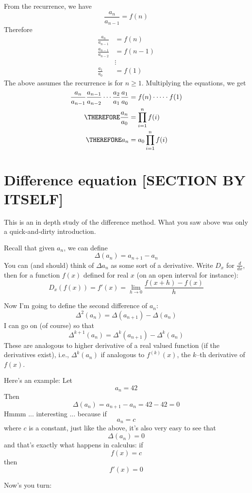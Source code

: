 From the recurrence, we have
\[
\frac{a_n}{a_{n-1}} = f(n) 
\]
Therefore
\begin{align*}
\frac{a_n}{a_{n-1}} &= f(n) \\ 
\frac{a_{n-1}}{a_{n-2}} &= f(n-1) \\
 &\vdots \\
\frac{a_1}{a_{0}} &= f(1) 
\end{align*}
The above assumes the recurrence is for $n \geq 1$.
Multiplying the equations, we get
\begin{align*}
  \frac{a_n}{a_{n-1}}
  \frac{a_{n-1}}{a_{n-2}}
  \cdots 
  \frac{a_{2}}{a_{1}}
  \frac{a_1}{a_0} &= f(n) \cdot \cdots \cdot f(1) \\
  \THEREFORE
  \frac{a_n}{a_0}
  &=  \prod_{i=1}^n f(i) \\
  \THEREFORE
  a_n &= a_0 \prod_{i=1}^n f(i)
\end{align*}




\newpage
\section{Difference equation [SECTION BY ITSELF]}

This is an in depth study of the difference method.
What you saw above was only a quick-and-dirty introduction.

Recall that given $a_n$, we can define
\[
\Delta (a_n) = a_{n+1} - a_n
\]
You can (and should) think of $\Delta a_n$ as some sort of a
derivative.
Write $D_x$ for $\frac{d}{dx}$, then for a function $f(x)$
defined for real $x$ (on an open interval for instance):
\[
D_x (f(x)) = f'(x) = \lim_{ h \rightarrow 0 } \frac{f(x+h) - f(x)}{h}
\]

Now I'm going to define the second difference of $a_n$:
\[
\Delta^2 (a_n) = \Delta (a_{n+1}) - \Delta (a_n)
\]
I can go on (of course) so that
\[
\Delta^{k+1} (a_n)
=
\Delta^k (a_{n+1})
-
\Delta^k (a_{n})
\]
These are analogous to higher derivative of a real valued
function (if the derivatives exist), i.e.,
$\Delta^k (a_n)$ if analogous to $f^{(k)}(x)$, the $k$--th
derivative of $f(x)$.

Here's an example: Let
\[
a_n = 42
\]
Then
\[
\Delta (a_n) = a_{n+1} - a_n = 42 - 42 = 0
\]
Hmmm ... interesting ... because if
\[
a_n = c
\]
where $c$ is a constant, just like the above,
it's also very easy to see that
\[
\Delta (a_n) = 0
\]
and that's exactly what happens in calculus: if
\[
f(x) = c
\]
then
\[
f'(x) = 0
\]

Now's you turn:

